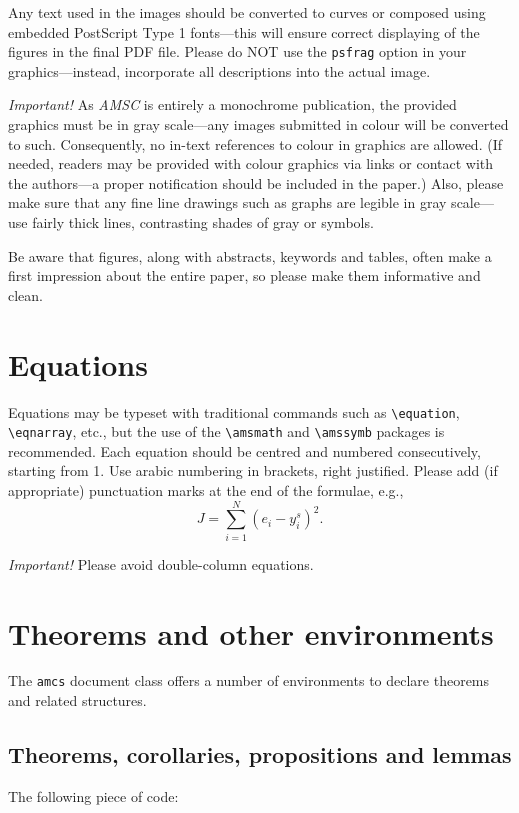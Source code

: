 \documentclass{amcs}
\begin{document}
Any text used in the images should be converted to curves or composed using embedded PostScript Type 1 fonts---this will ensure correct displaying of the figures in the final PDF file. Please do NOT use the \verb+psfrag+ option in your graphics---instead, incorporate all descriptions into the actual image.

\emph{Important!} As \emph{AMSC} is entirely a monochrome publication, the provided graphics must be in gray scale---any images submitted in colour will be converted to such. Consequently, no in-text references to colour in graphics are allowed. (If needed, readers may be provided with colour graphics via links or contact with the authors---a proper notification should be included in the paper.) Also, please make sure that any fine line drawings such as graphs are legible in gray scale---use fairly thick lines, contrasting shades of gray or symbols.

Be aware that figures, along with abstracts, keywords and tables, often make a first impression about the entire paper, so please make them informative and clean.

\section{Equations}
Equations may be typeset with traditional commands such as \verb+\equation+, \verb+\eqnarray+, etc., but the use of the \verb+\amsmath+ and \verb+\amssymb+ packages is recommended. Each equation should be centred and numbered consecutively, starting from 1. Use arabic numbering in brackets, right justified. Please add (if appropriate) punctuation marks at the end of the formulae, e.g.,
%
\begin{equation}
  J=\sum_{i=1}^N(e_i-y_i^s)^2.
\end{equation}

\noindent \emph{Important!} Please avoid double-column equations.

\section{Theorems and other environments}
The \verb+amcs+ document class offers a number of environments to declare theorems and related structures.

\subsection{Theorems, corollaries, propositions and lemmas} The following piece of code:
\end{document}
